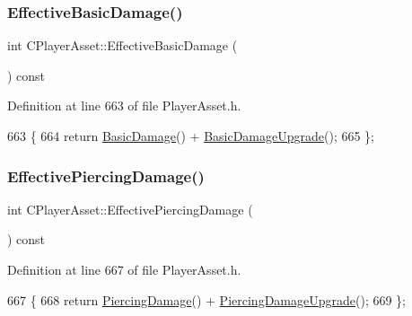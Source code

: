 \subsubsection{\texorpdfstring{Effective\+Basic\+Damage()}{EffectiveBasicDamage()}}
{\footnotesize\ttfamily int C\+Player\+Asset\+::\+Effective\+Basic\+Damage (\begin{DoxyParamCaption}{ }\end{DoxyParamCaption}) const\hspace{0.3cm}{\ttfamily [inline]}}



Definition at line 663 of file Player\+Asset.\+h.


\begin{DoxyCode}
663                                         \{
664             \textcolor{keywordflow}{return} \hyperlink{classCPlayerAsset_a17dcdcd436e6edfab325bc4dbca4f03c}{BasicDamage}() + \hyperlink{classCPlayerAsset_affad00c05e4a1325601f2dc23df1cf05}{BasicDamageUpgrade}();
665         \};
\end{DoxyCode}
\hypertarget{classCPlayerAsset_a180f67342aa933dbf0918759714858e3}{}\label{classCPlayerAsset_a180f67342aa933dbf0918759714858e3} 
\subsubsection{\texorpdfstring{Effective\+Piercing\+Damage()}{EffectivePiercingDamage()}}
{\footnotesize\ttfamily int C\+Player\+Asset\+::\+Effective\+Piercing\+Damage (\begin{DoxyParamCaption}{ }\end{DoxyParamCaption}) const\hspace{0.3cm}{\ttfamily [inline]}}



Definition at line 667 of file Player\+Asset.\+h.


\begin{DoxyCode}
667                                            \{
668             \textcolor{keywordflow}{return} \hyperlink{classCPlayerAsset_a1949069b1bec611fdfa74488a3d6864f}{PiercingDamage}() + \hyperlink{classCPlayerAsset_af7403a6a0eab4eaedd2b04d66e21d601}{PiercingDamageUpgrade}();
669         \};
\end{DoxyCode}
\hypertarget{classCPlayerAsset_af2a2747655729e3a58586f28ddd7cd8d}{}\label{classCPlayerAsset_af2a2747655729e3a58586f28ddd7cd8d} 
